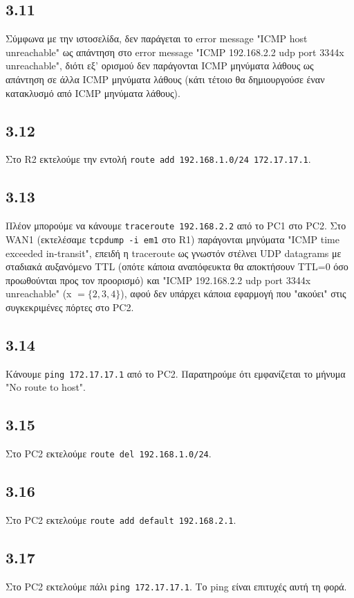 \documentclass[a4paper, 12pt]{article}
\begin{document}
	\subsection*{3.11}
		Σύμφωνα με την ιστοσελίδα, δεν παράγεται το error message "ICMP host unreachable" ως απάντηση στο error message "ICMP 192.168.2.2 udp port 3344x unreachable", διότι εξ' ορισμού δεν παράγονται ICMP μηνύματα λάθους ως απάντηση σε άλλα ICMP μηνύματα λάθους (κάτι τέτοιο θα δημιουργούσε έναν κατακλυσμό από ICMP μηνύματα λάθους). 

	\subsection*{3.12}
		Στο R2 εκτελούμε την εντολή \verb|route add 192.168.1.0/24 172.17.17.1|.

	\subsection*{3.13}
		Πλέον μπορούμε να κάνουμε \verb|traceroute 192.168.2.2| από το PC1 στο PC2. Στο WAN1 (εκτελέσαμε \verb|tcpdump -i em1| στο R1) παράγονται μηνύματα "ICMP time exceeded in-transit", επειδή η traceroute ως γνωστόν στέλνει UDP datagrams με σταδιακά αυξανόμενο TTL (οπότε κάποια αναπόφευκτα θα αποκτήσουν TTL=0 όσο προωθούνται προς τον προορισμό) και "ICMP 192.168.2.2 udp port 3344x unreachable" (x $= \{2,3,4\}$), αφού δεν υπάρχει κάποια εφαρμογή που "ακούει" στις συγκεκριμένες πόρτες στο PC2.

	\subsection*{3.14}
		Κάνουμε \verb|ping 172.17.17.1| από το PC2. Παρατηρούμε ότι εμφανίζεται το μήνυμα "No route to host".

	\subsection*{3.15}
		Στο PC2 εκτελούμε \verb|route del 192.168.1.0/24|.

	\subsection*{3.16}
		Στο PC2 εκτελούμε \verb|route add default 192.168.2.1|.

	\subsection*{3.17}
		Στο PC2 εκτελούμε πάλι \verb|ping 172.17.17.1|. Το ping είναι επιτυχές αυτή τη φορά.
		
\end{document}
